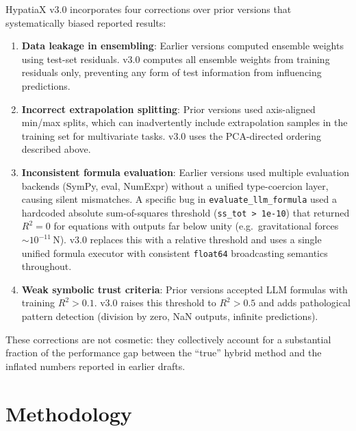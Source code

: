 \documentclass[twoside,11pt]{article}
\newcommand{\Rsq}{R^{2}}
\begin{document}
HypatiaX v3.0 incorporates four corrections over prior versions that systematically
biased reported results:

\begin{enumerate}[leftmargin=2em,label=\arabic*.]
  \item \textbf{Data leakage in ensembling}: Earlier versions computed ensemble
    weights using test-set residuals.  v3.0 computes all ensemble weights from
    training residuals only, preventing any form of test information from
    influencing predictions.

  \item \textbf{Incorrect extrapolation splitting}: Prior versions used axis-aligned
    min/max splits, which can inadvertently include extrapolation samples in the
    training set for multivariate tasks.  v3.0 uses the PCA-directed ordering
    described above.

  \item \textbf{Inconsistent formula evaluation}\label{sec:r2_bugfix}: Earlier
    versions used multiple evaluation backends (SymPy, eval, NumExpr) without a
    unified type-coercion layer, causing silent mismatches.  A specific bug in
    \texttt{evaluate\_llm\_formula} used a hardcoded absolute sum-of-squares
    threshold (\texttt{ss\_tot > 1e-10}) that returned $\Rsq = 0$ for equations
    with outputs far below unity (e.g.\ gravitational forces $\sim 10^{-11}$\,N).
    v3.0 replaces this with a relative threshold and uses a single unified formula
    executor with consistent \texttt{float64} broadcasting semantics throughout.

  \item \textbf{Weak symbolic trust criteria}: Prior versions accepted LLM formulas
    with training $\Rsq > 0.1$.  v3.0 raises this threshold to $\Rsq > 0.5$ and
    adds pathological pattern detection (division by zero, NaN outputs, infinite
    predictions).
\end{enumerate}

These corrections are not cosmetic: they collectively account for a substantial
fraction of the performance gap between the ``true'' hybrid method and the inflated
numbers reported in earlier drafts.

\section{Methodology}
\label{sec:method}
\end{document}
